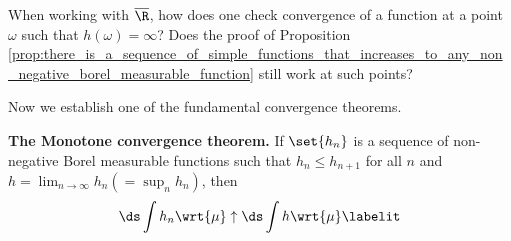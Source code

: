 \documentclass{article} %
\begin{document}
\begin{question}
When working with $\overline{\R}$, how does one check convergence of a function at a point $\omega$ such that $h(\omega)=\infty$?  Does the proof of Proposition \ref{prop:there_is_a_sequence_of_simple_functions_that_increases_to_any_non_negative_borel_measurable_function} still work at such points?
\end{question}


Now we establish one of the fundamental convergence theorems. 

\begin{theorem}{\textbf{The Monotone convergence theorem.}}
If $\set{h_n}$ is a sequence of non-negative Borel measurable functions such that $h_n \leq h_{n+1}$ for all $n$ and $h =\lim_{n \to \infty} h_n (= \sup_n h_n)$, then 
\begin{align*}
\ds \int h_n \wrt{\mu} \uparrow \ds\int h \wrt{\mu}
\labelit \label{eqn:monotone_convergence_theorem_conclusion}	
\end{align*}
\label{thm:monotone_convergence_theorem}
\end{theorem}
\end{document}
